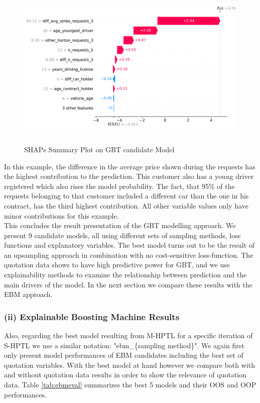 \documentclass[12pt,titlepage]{article}
\begin{document}
\begin{figure}[H]
    \centerline{\includegraphics[height=8cm]{shap_waterfall_example.png}}
    \caption{SHAPs Summary Plot on GBT candidate Model}
    \label{fig:shapsum}
\end{figure}
\noindent
In this example, the difference in the average price shown during the requests has the highest contribution to the prediction. This customer also has a young driver registered which also rises the model probability. The fact, that 95\% of the requests belonging to that customer included a different car than the one in his contract, has the third highest contribution. All other variable values only have minor contributions for this example. \\

This concludes the result presentation of the GBT modelling approach. We present 9 candidate models, all using different sets of sampling methods, loss functions and explanatory variables. The best model turns out to be the result of an upsampling approach in combination with no cost-sensitive loss-function. The quotation data shows to have high predictive power for GBT, and we use explainability methods to examine the relationship between prediction and the main drivers of the model. In the next section we compare these results with the EBM approach. \\

\subsubsection*{(ii) Explainable Boosting Machine Results}

Also, regarding the best model resulting from M-HPTL for a specific iteration of S-HPTL we use a similar notation: "ebm\_\{sampling method\}". We again first only present model performances of EBM candidates including the best set of quotation variables. With the best model at hand however we compare both with and without quotation data results in order to show the relevance of quotation data. Table \ref{tab:ebmeval} summarizes the best 5 models and their OOS and OOP performances.\\
\end{document}
